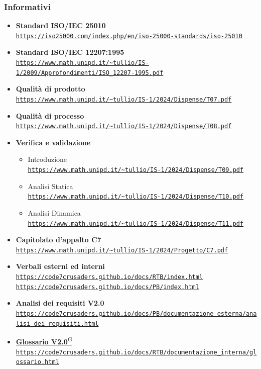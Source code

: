 \documentclass{article}
\begin{document}
\subsubsection{Informativi}
\begin{itemize}
    \item \textbf{Standard ISO/IEC 25010} \\ \texttt{\url{https://iso25000.com/index.php/en/iso-25000-standards/iso-25010}}
    \item \textbf{Standard ISO/IEC 12207:1995} \\ \texttt{\url{https://www.math.unipd.it/~tullio/IS-1/2009/Approfondimenti/ISO_12207-1995.pdf}}
    \item \textbf{Qualità di prodotto} \\ \texttt{\url{https://www.math.unipd.it/~tullio/IS-1/2024/Dispense/T07.pdf}}
    \item \textbf{Qualità di processo} \\ \texttt{\url{https://www.math.unipd.it/~tullio/IS-1/2024/Dispense/T08.pdf}}
    \item \textbf{Verifica e validazione}
    \begin{itemize}
        \item Introduzione \\ \texttt{\url{https://www.math.unipd.it/~tullio/IS-1/2024/Dispense/T09.pdf}}
        \item Analisi Statica \\ \texttt{\url{https://www.math.unipd.it/~tullio/IS-1/2024/Dispense/T10.pdf}}
        \item Analisi Dinamica \\ \texttt{\url{https://www.math.unipd.it/~tullio/IS-1/2024/Dispense/T11.pdf}}
    \end{itemize}
    \item \textbf{Capitolato d'appalto C7} \\ \texttt{\url{https://www.math.unipd.it/~tullio/IS-1/2024/Progetto/C7.pdf}}
    \item \textbf{Verbali esterni ed interni} \\ \texttt{\url{https://code7crusaders.github.io/docs/RTB/index.html}} \\ \texttt{\url{https://code7crusaders.github.io/docs/PB/index.html}}
    \item \textbf{Analisi dei requisiti V2.0} \\ \texttt{\url{https://code7crusaders.github.io/docs/PB/documentazione_esterna/analisi_dei_requisiti.html}}
    \item \href{https://code7crusaders.github.io/docs/PB/documentazione_interna/glossario.html#glossario}{\textbf{Glossario V2.0}\textsuperscript{G}} \\ \texttt{\url{https://code7crusaders.github.io/docs/RTB/documentazione_interna/glossario.html}}
\end{itemize}
\newpage
\end{document}
